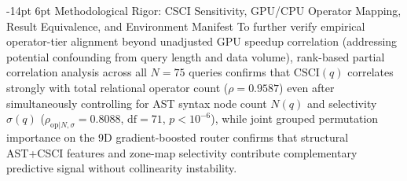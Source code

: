 \documentclass[10pt,a4paper]{article}
\makeatletter
\renewcommand\subsection{\@startsection{subsection}{2}{\z@}%
  {-14pt \@plus -3pt \@minus -1.5pt}%
  {6pt \@plus 1.5pt}%
  {\normalfont\normalsize\bfseries}}
\makeatother
\begin{document}
\subsection{Methodological Rigor: CSCI Sensitivity, GPU/CPU Operator Mapping, Result Equivalence, and Environment Manifest}
To further verify empirical operator-tier alignment beyond unadjusted GPU speedup correlation (addressing potential confounding from query length and data volume), rank-based partial correlation analysis across all $N=75$ queries confirms that $\text{CSCI}(q)$ correlates strongly with total relational operator count ($\rho = 0.9587$) even after simultaneously controlling for AST syntax node count $N(q)$ and selectivity $\sigma(q)$ ($\rho_{\text{op}|N,\sigma} = 0.8088$, $\text{df}=71$, $p < 10^{-6}$), while joint grouped permutation importance on the 9D gradient-boosted router confirms that structural AST+CSCI features and zone-map selectivity contribute complementary predictive signal without collinearity instability.
\end{document}
